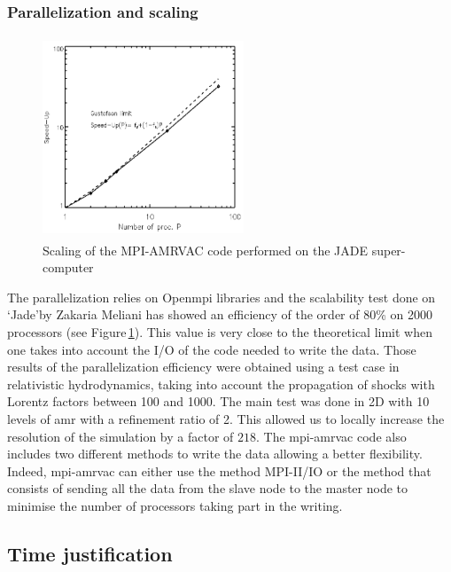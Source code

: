 \documentclass[
    a4paper, 
    12pt, onecolumn,
]{article}
\begin{document}
\subsubsection*{Parallelization and scaling}
\begin{figure}
\vspace*{-60pt}
\includegraphics[height=6cm, width=6cm]{scaling_1}
\caption{Scaling of the MPI-AMRVAC code performed on the JADE super-computer}
\label{fig:scaling_JADE}
\end{figure} 
\indent The parallelization relies on Open{\sc mpi} libraries and the scalability test done on \lq Jade\rq  by Zakaria M{\sc eliani} has showed an efficiency of the order of 80\% on 2000 processors (see Figure\,\ref{fig:scaling_JADE}). This value is very close to the theoretical limit when one takes into account the I/O of the code needed to write the data. Those results of the parallelization efficiency were obtained using a test case in relativistic hydrodynamics, taking into account the propagation of shocks with Lorentz factors between 100 and 1000. The main test was done in 2D with 10 levels of {\sc amr} with a refinement ratio of 2. This allowed us to locally increase the resolution of the simulation by a factor of $218$. The {\sc mpi-amrvac} code also includes two different methods to write the data allowing a better flexibility. Indeed, {\sc mpi-amrvac} can either use the method  MPI-II/IO or the method that consists of sending all the data from the slave node to the master node to minimise the number of processors taking part in the writing.

\subsection{Time justification}
\end{document}
